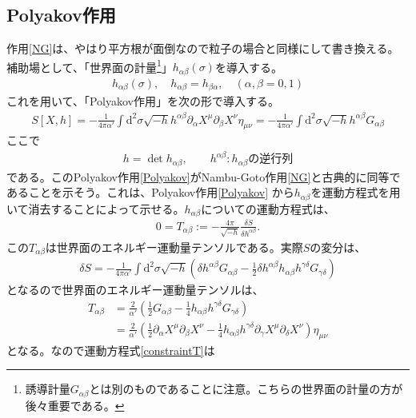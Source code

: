 \documentclass[report,paper=a4, fontsize=12pt, line_length=16cm, number_of_lines=33,dvipdfmx]{jlreq}
\numberwithin{equation}{chapter}
\numberwithin{equation}{section}
\newcommand{\del}{\partial}
\newcommand{\di}{\mathrm{d}}
\begin{document}
\subsection{Polyakov作用}
作用\eqref{NG}は、やはり平方根が面倒なので粒子の場合と同様にして書き換える。
補助場として、「世界面の計量\footnote{誘導計量$G_{\alpha\beta}$とは別のものであることに注意。こちらの世界面の計量の方が後々重要である。}」$h_{\alpha\beta}(\sigma)$を導入する。
\begin{align}
h_{\alpha\beta}(\sigma),\quad
h_{\alpha\beta}=h_{\beta\alpha},\quad
(\alpha,\beta=0,1)
\end{align}
これを用いて、「Polyakov作用」を次の形で導入する。
\begin{align}
S[X,h]=-\frac{1}{4\pi\alpha'}\int \di^2\sigma \sqrt{-h}h^{\alpha\beta}\del_{\alpha}X^{\mu}\del_{\beta}X^{\nu}\eta_{\mu\nu}=
-\frac{1}{4\pi\alpha'}\int \di^2\sigma \sqrt{-h}h^{\alpha\beta}G_{\alpha\beta}
\label{Polyakov}
\end{align}
ここで
\begin{align}
h=\det h_{\alpha\beta},\qquad h^{\alpha\beta} : h_{\alpha\beta}\text{の逆行列}
\end{align}
である。このPolyakov作用\eqref{Polyakov}がNambu-Goto作用\eqref{NG}と古典的に同等であることを示そう。これは、Polyakov作用\eqref{Polyakov}
から$h_{\alpha\beta}$を運動方程式を用いて消去することによって示せる。$h_{\alpha\beta}$についての運動方程式は、
\begin{align}
0=T_{\alpha\beta}:=-\frac{4\pi}{\sqrt{-h}}\frac{\delta S}{\delta h^{\alpha\beta}}. \label{constraintT}
\end{align}
この$T_{\alpha\beta}$は世界面のエネルギー運動量テンソルである。実際$S$の変分は、
\begin{align}
\delta S=-\frac{1}{4\pi\alpha'}\int \di^2\sigma \sqrt{-h}\left(\delta h^{\alpha\beta}G_{\alpha\beta}-\frac12 \delta h^{\alpha\beta} h_{\alpha\beta}
h^{\gamma\delta}G_{\gamma\delta}
\right)
\end{align}
となるので世界面のエネルギー運動量テンソルは、
\begin{align}
 T_{\alpha\beta}&=\frac{2}{\alpha'}\left(\frac12 G_{\alpha\beta}-\frac14 h_{\alpha\beta}h^{\gamma\delta}G_{\gamma\delta}\right)\nonumber\\
 &=\frac{2}{\alpha'}\left(\frac12 \del_{\alpha}X^{\mu}\del_{\beta}X^{\nu} - \frac14 h_{\alpha\beta}h^{\gamma\delta}\del_{\gamma} X^{\mu}\del_{\delta}X^{\nu}\right)\eta_{\mu\nu}
 \label{EM}
\end{align}
となる。なので運動方程式\eqref{constraintT}は
\end{document}
